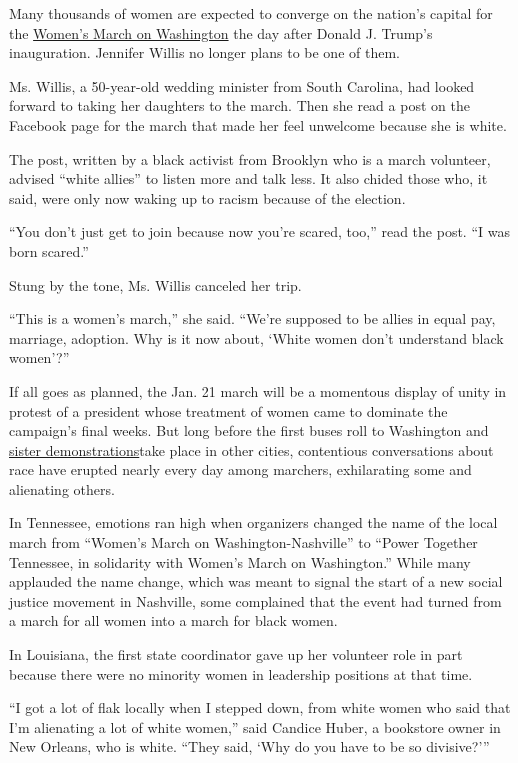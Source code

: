 Many thousands of women are expected to converge on the nation's capital
for the
\href{https://www.nytimes3xbfgragh.onion/2016/11/19/us/womens-march-on-washington.html}{Women's
March on Washington} the day after Donald J. Trump's inauguration.
Jennifer Willis no longer plans to be one of them.

Ms. Willis, a 50-year-old wedding minister from South Carolina, had
looked forward to taking her daughters to the march. Then she read a
post on the Facebook page for the march that made her feel unwelcome
because she is white.

The post, written by a black activist from Brooklyn who is a march
volunteer, advised ``white allies'' to listen more and talk less. It
also chided those who, it said, were only now waking up to racism
because of the election.

``You don't just get to join because now you're scared, too,'' read the
post. ``I was born scared.''

Stung by the tone, Ms. Willis canceled her trip.

``This is a women's march,'' she said. ``We're supposed to be allies in
equal pay, marriage, adoption. Why is it now about, `White women don't
understand black women'?''

If all goes as planned, the Jan. 21 march will be a momentous display of
unity in protest of a president whose treatment of women came to
dominate the campaign's final weeks. But long before the first buses
roll to Washington and
\href{https://womensmarch.squarespace.com/sisters}{sister
demonstrations}take place in other cities, contentious conversations
about race have erupted nearly every day among marchers, exhilarating
some and alienating others.

In Tennessee, emotions ran high when organizers changed the name of the
local march from ``Women's March on Washington-Nashville'' to ``Power
Together Tennessee, in solidarity with Women's March on Washington.''
While many applauded the name change, which was meant to signal the
start of a new social justice movement in Nashville, some complained
that the event had turned from a march for all women into a march for
black women.

In Louisiana, the first state coordinator gave up her volunteer role in
part because there were no minority women in leadership positions at
that time.

``I got a lot of flak locally when I stepped down, from white women who
said that I'm alienating a lot of white women,'' said Candice Huber, a
bookstore owner in New Orleans, who is white. ``They said, `Why do you
have to be so divisive?'''

